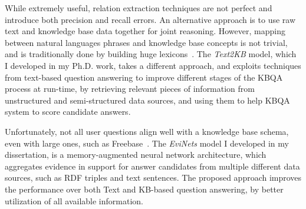 While extremely useful, relation extraction techniques are not perfect and introduce both precision and recall errors.
An alternative approach is to use raw text and knowledge base data together for joint reasoning.
However, mapping between natural languages phrases and knowledge base concepts is not trivial, and is traditionally done by building huge lexicons~\cite{BerantCFL13:sempre,BerantL14:parasempre}.
The \textit{Text2KB} model, which I developed in my Ph.D. work, takes a different approach, and exploits techniques from text-based question answering to improve different stages of the KBQA process at run-time, \ie by retrieving relevant pieces of information from unstructured and semi-structured data sources, and using them to help KBQA system to score candidate answers.

Unfortunately, not all user questions align well with a knowledge base schema, even with large ones, such as Freebase~\cite{Fader:2014:OQA:2623330.2623677}.
The \textit{EviNets} model I developed in my dissertation, is a memory-augmented neural network architecture, which aggregates evidence in support for answer candidates from multiple different data sources, such as RDF triples and text sentences.
The proposed approach improves the performance over both Text and KB-based question answering, by better utilization of all available information.


